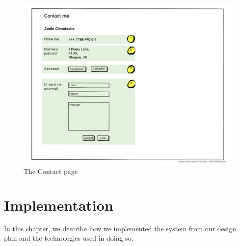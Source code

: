 \documentclass{l3proj}
\begin{document}
\begin{figure}
\label{wireframes:contact}
\begin{center}
\includegraphics[width=\linewidth, trim = 0px 40px 0px 220px]
	{wireframes/contact}
\caption{The Contact page}
\end{center}
\end{figure}


\chapter{Implementation}
\label{chap:impl}

In this chapter, we describe how we implemented the system from our design plan and the technologies used in doing so.


\label{chap:ui}
\end{document}
